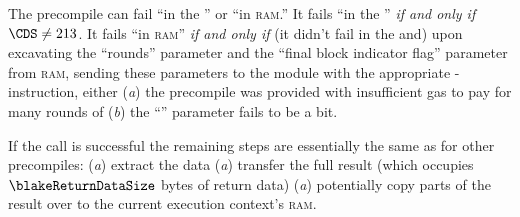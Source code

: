 The \instBlake{} precompile can fail ``in the \hubMod{}'' or ``in \textsc{ram}.''
It fails ``in the \hubMod{}'' \emph{if and only if} $\CDS \neq 213$.
It fails ``in \textsc{ram}''  \emph{if and only if} (it didn't fail in the \hubMod{} and) upon excavating the
``rounds''                     parameter \locBlakeR{} and the 
``final block indicator flag'' parameter \locBlakeF{}
from \textsc{ram}, sending these parameters to the \oobMod{} module with the appropriate \oobMod{}-instruction, either
(\emph{a}) the precompile was provided with insufficient gas to pay for \locBlakeR{} many rounds of \instBlake{}
(\emph{b}) the ``\locBlakeF{}'' parameter fails to be a bit.

If the call is successful the remaining steps are essentially the same as for other precompiles:
(\emph{a}) extract the data
(\emph{a}) transfer the full result (which occupies $\blakeReturnDataSize$ bytes of return data)
(\emph{a}) potentially copy parts of the result over to the current execution context's \textsc{ram}.
